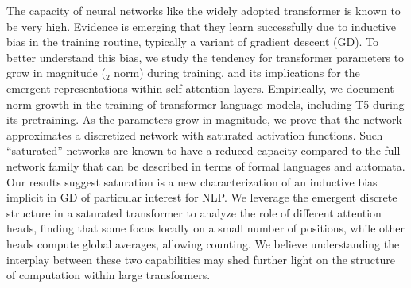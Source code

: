 The capacity of neural networks like the widely adopted transformer is known to be very high. Evidence is emerging that they learn successfully due to inductive bias in the training routine, typically a variant of gradient descent (GD). To better understand this bias, we study the tendency for transformer parameters to grow in magnitude (\ell$_2$ norm) during training, and its implications for the emergent representations within self attention layers. Empirically, we document norm growth in the training of transformer language models, including T5 during its pretraining. As the parameters grow in magnitude, we prove that the network approximates a discretized network with saturated activation functions. Such ``saturated'' networks are known to have a reduced capacity compared to the full network family that can be described in terms of formal languages and automata. Our results suggest saturation is a new characterization of an inductive bias implicit in GD of particular interest for NLP. We leverage the emergent discrete structure in a saturated transformer to analyze the role of different attention heads, finding that some focus locally on a small number of positions, while other heads compute global averages, allowing counting. We believe understanding the interplay between these two capabilities may shed further light on the structure of computation within large transformers.
